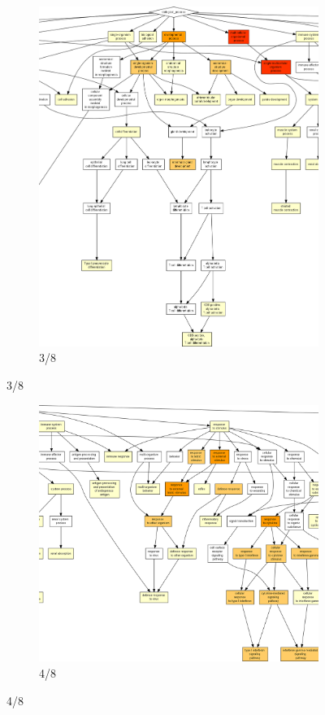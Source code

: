 \begin{figure}[p]
\ContinuedFloat
\begin{subfigure}{\textwidth}
\includegraphics[width=\textwidth]
{Figures/tfc-go-all-graph/tfc-go-all-graph_2.png}
\caption{3/8}
\end{subfigure}
\end{figure}

\begin{figure}[p]
\ContinuedFloat
\begin{subfigure}{\textwidth}
\includegraphics[width=\textwidth]
{Figures/tfc-go-all-graph/tfc-go-all-graph_3.png}
\caption{4/8}
\end{subfigure}
\end{figure}

